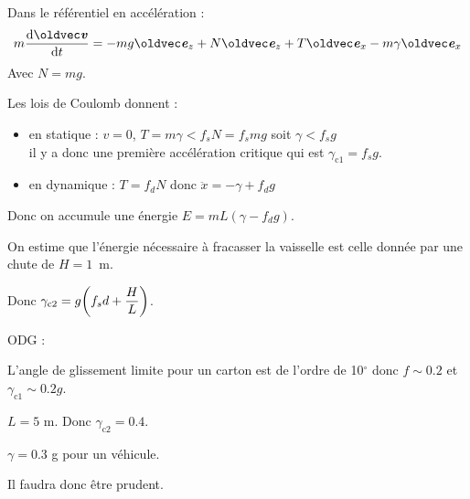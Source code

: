 \begin{solution}
Dans le référentiel en accélération :
    $$m\dv{\vec{v}}{t} = -mg\vec{e}_z + N\vec{e}_z + T\vec{e}_x - m\gamma\vec{e}_x$$
Avec $N = mg$.

Les lois de Coulomb donnent :
\begin{itemize}
    \item en statique : $v = 0$, $T = m\gamma < f_s N = f_s m g$ soit $\gamma < f_s g$ \\
    \noindent il y a donc une première accélération critique qui est $\gamma_\text{c1} = f_s g$.
    \item en dynamique : $T = f_d N$ donc $\ddot{x} = -\gamma + f_d g$
\end{itemize}

Donc on accumule une énergie $E = m L (\gamma - f_d g)$.

On estime que l'énergie nécessaire à fracasser la vaisselle est celle donnée par une chute de $H = 1$~m.

Donc $\gamma_\text{c2} = g\qty(f_sd + \dfrac{H}{L})$.

ODG :


L'angle de glissement limite pour un carton est de l'ordre de 10$^\circ$ donc $f \sim 0.2$ et $\gamma_\text{c1} \sim 0.2g$.

$L = 5$ m. Donc $\gamma_\text{c2} = 0.4$.

$\gamma = 0.3$ g pour un véhicule.

Il faudra donc être prudent.


\end{solution}


